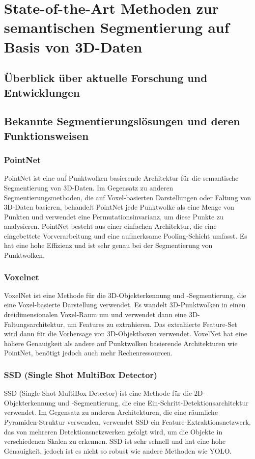 \chapter{State-of-the-Art Methoden zur semantischen Segmentierung auf Basis von 3D-Daten}
\section{Überblick über aktuelle Forschung und Entwicklungen}
\section{Bekannte Segmentierungslösungen und deren Funktionsweisen}
\subsection{PointNet}
PointNet ist eine auf Punktwolken basierende Architektur für die semantische
Segmentierung von 3D-Daten. Im Gegensatz zu anderen Segmentierungsmethoden, die
auf Voxel-basierten Darstellungen oder Faltung von 3D-Daten basieren, behandelt
PointNet jede Punktwolke als eine Menge von Punkten und verwendet eine
Permutationsinvarianz, um diese Punkte zu analysieren. PointNet besteht aus
einer einfachen Architektur, die eine eingebettete Vorverarbeitung und eine
aufmerksame Pooling-Schicht umfasst. Es hat eine hohe Effizienz und ist sehr
genau bei der Segmentierung von Punktwolken.
\subsection{Voxelnet}
VoxelNet ist eine Methode für die 3D-Objekterkennung und -Segmentierung, die
eine Voxel-basierte Darstellung verwendet. Es wandelt 3D-Punktwolken in einen
dreidimensionalen Voxel-Raum um und verwendet dann eine 3D-Faltungsarchitektur,
um Features zu extrahieren. Das extrahierte Feature-Set wird dann für die
Vorhersage von 3D-Objektboxen verwendet. VoxelNet hat eine höhere Genauigkeit
als andere auf Punktwolken basierende Architekturen wie PointNet, benötigt
jedoch auch mehr Rechenressourcen.
\subsection{SSD (Single Shot MultiBox Detector)}
SSD (Single Shot MultiBox Detector) ist eine Methode für die 2D-Objekterkennung
und -Segmentierung, die eine Ein-Schritt-Detektionsarchitektur verwendet. Im
Gegensatz zu anderen Architekturen, die eine räumliche Pyramiden-Struktur
verwenden, verwendet SSD ein Feature-Extraktionsnetzwerk, das von mehreren
Detektionsnetzwerken gefolgt wird, um die Objekte in verschiedenen Skalen zu
erkennen. SSD ist sehr schnell und hat eine hohe Genauigkeit, jedoch ist es
nicht so robust wie andere Methoden wie YOLO.
